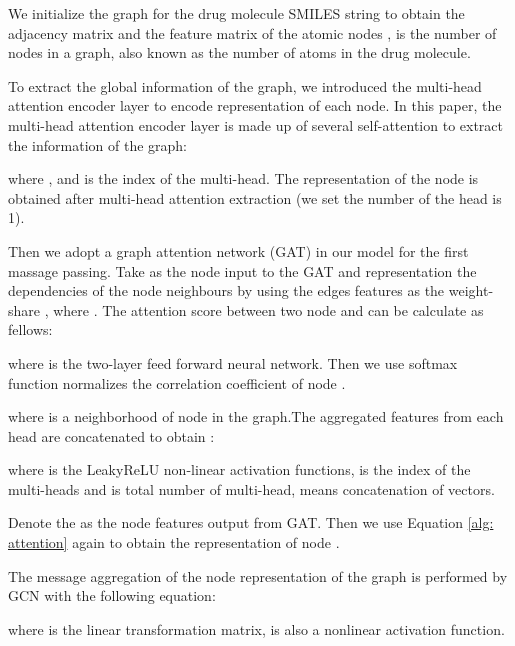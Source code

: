 \documentclass{article}
\begin{document}
We initialize the graph for the drug molecule SMILES string to obtain the adjacency matrix    and the feature matrix of the atomic nodes ,  is the number of nodes in a graph, also known as the number of atoms in the drug molecule.

To extract the global information of the graph, we introduced the multi-head attention encoder layer to encode representation of each node. In this paper, the multi-head attention encoder layer is made up of several self-attention to extract the  information of the graph: 










\noindent where , and  is the index of the multi-head. The representation of the node  is obtained after multi-head attention extraction (we set the number of the head is 1).


Then we adopt a graph attention network (GAT) \cite{GAT} in our model for the first massage passing.
Take  as the node input to the GAT and representation the dependencies of the node neighbours by using the edges features  as the  weight-share  , where . The attention score between two node  and  can be calculate as fellows:






\noindent where  is the two-layer feed forward neural network. Then  we use softmax function normalizes the correlation coefficient of node .







\noindent where  is a neighborhood of node  in the graph.The aggregated features from each head are concatenated to obtain :




\noindent where  is the LeakyReLU non-linear activation functions,  is the index of the multi-heads and  is total number of multi-head,    means concatenation of vectors.

Denote the  as the node features output from GAT. Then we use Equation \ref{alg: attention} again to obtain the representation of node  .




The message aggregation of the node representation  of the graph is performed by GCN with the following equation:



\noindent where  is the linear transformation matrix,  is also a nonlinear activation function.
\end{document}
